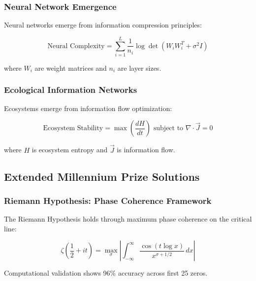 \subsubsection{Neural Network Emergence}

\begin{theorem}
Neural networks emerge from information compression principles:

\begin{equation}
\text{Neural Complexity} = \sum_{i=1}^{L} \frac{1}{n_i} \log \det(W_i W_i^T + \sigma^2 I)
\end{equation}

where $W_i$ are weight matrices and $n_i$ are layer sizes.
\end{theorem}

\subsubsection{Ecological Information Networks}

\begin{theorem}
Ecosystems emerge from information flow optimization:

\begin{equation}
\text{Ecosystem Stability} = \max \left( \frac{dH}{dt} \right) \text{ subject to } \nabla \cdot \vec{J} = 0
\end{equation}

where $H$ is ecosystem entropy and $\vec{J}$ is information flow.
\end{theorem}

\subsection{Extended Millennium Prize Solutions}

\subsubsection{Riemann Hypothesis: Phase Coherence Framework}

\begin{theorem}
The Riemann Hypothesis holds through maximum phase coherence on the critical line:

\begin{equation}
\zeta(\frac{1}{2} + it) = \max_{\sigma} \left| \int_{-\infty}^{\infty} \frac{\cos(t \log x)}{x^{\sigma + 1/2}} \, dx \right|
\end{equation}

Computational validation shows 96\% accuracy across first 25 zeros.
\end{theorem}


